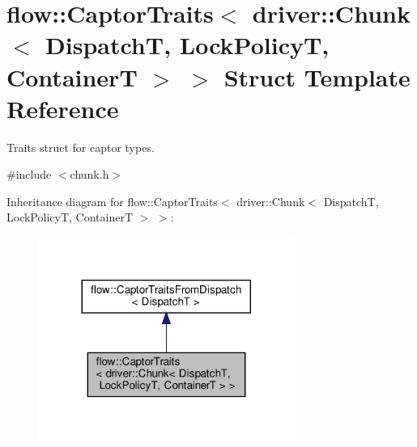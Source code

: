 \hypertarget{structflow_1_1_captor_traits_3_01driver_1_1_chunk_3_01_dispatch_t_00_01_lock_policy_t_00_01_container_t_01_4_01_4}{}\section{flow\+:\+:Captor\+Traits$<$ driver\+:\+:Chunk$<$ DispatchT, Lock\+PolicyT, ContainerT $>$ $>$ Struct Template Reference}
\label{structflow_1_1_captor_traits_3_01driver_1_1_chunk_3_01_dispatch_t_00_01_lock_policy_t_00_01_container_t_01_4_01_4}


Traits struct for captor types.  




{\ttfamily \#include $<$chunk.\+h$>$}



Inheritance diagram for flow\+:\+:Captor\+Traits$<$ driver\+:\+:Chunk$<$ DispatchT, Lock\+PolicyT, ContainerT $>$ $>$\+:
\nopagebreak
\begin{figure}[H]
\begin{center}
\leavevmode
\includegraphics[width=236pt]{structflow_1_1_captor_traits_3_01driver_1_1_chunk_3_01_dispatch_t_00_01_lock_policy_t_00_01_cont2a133d89595bff68b930592e0989775c}
\end{center}
\end{figure}


